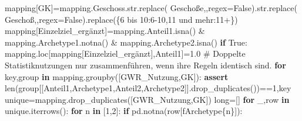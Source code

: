 \documentclass[
  ngerman,
  a4paper,
  DIV=11]{scrreprt}
\newenvironment{Shaded}{\begin{snugshade}}{\end{snugshade}}
\newcommand{\BuiltInTok}[1]{\textcolor[rgb]{0.00,0.23,0.31}{#1}}
\newcommand{\CommentTok}[1]{\textcolor[rgb]{0.37,0.37,0.37}{#1}}
\newcommand{\ControlFlowTok}[1]{\textcolor[rgb]{0.00,0.23,0.31}{\textbf{#1}}}
\newcommand{\DecValTok}[1]{\textcolor[rgb]{0.68,0.00,0.00}{#1}}
\newcommand{\FloatTok}[1]{\textcolor[rgb]{0.68,0.00,0.00}{#1}}
\newcommand{\KeywordTok}[1]{\textcolor[rgb]{0.00,0.23,0.31}{\textbf{#1}}}
\newcommand{\NormalTok}[1]{\textcolor[rgb]{0.00,0.23,0.31}{#1}}
\newcommand{\OperatorTok}[1]{\textcolor[rgb]{0.37,0.37,0.37}{#1}}
\newcommand{\SpecialCharTok}[1]{\textcolor[rgb]{0.37,0.37,0.37}{#1}}
\newcommand{\SpecialStringTok}[1]{\textcolor[rgb]{0.13,0.47,0.30}{#1}}
\newcommand{\StringTok}[1]{\textcolor[rgb]{0.13,0.47,0.30}{#1}}
\newcommand{\VariableTok}[1]{\textcolor[rgb]{0.07,0.07,0.07}{#1}}
\begin{document}
\begin{Shaded}
\begin{Highlighting}[]
\NormalTok{mapping[}\StringTok{\textquotesingle{}GK\textquotesingle{}}\NormalTok{]}\OperatorTok{=}\NormalTok{mapping.Geschoss.}\BuiltInTok{str}\NormalTok{.replace(}\StringTok{\textquotesingle{} Geschoße\textquotesingle{}}\NormalTok{,}\StringTok{\textquotesingle{}\textquotesingle{}}\NormalTok{,regex}\OperatorTok{=}\VariableTok{False}\NormalTok{).}\BuiltInTok{str}\NormalTok{.replace(}\StringTok{\textquotesingle{} Geschoß\textquotesingle{}}\NormalTok{,}\StringTok{\textquotesingle{}\textquotesingle{}}\NormalTok{,regex}\OperatorTok{=}\VariableTok{False}\NormalTok{).replace(\{}\StringTok{\textquotesingle{}6 bis 10\textquotesingle{}}\NormalTok{:}\StringTok{\textquotesingle{}6{-}10\textquotesingle{}}\NormalTok{,}\StringTok{\textquotesingle{}11 und mehr\textquotesingle{}}\NormalTok{:}\StringTok{\textquotesingle{}11+\textquotesingle{}}\NormalTok{\})}
\NormalTok{mapping[}\StringTok{\textquotesingle{}Einzelziel\_ergänzt\textquotesingle{}}\NormalTok{]}\OperatorTok{=}\NormalTok{mapping.Anteil1.isna() }\OperatorTok{\&}\NormalTok{ mapping.Archetype1.notna() }\OperatorTok{\&}\NormalTok{ mapping.Archetype2.isna()}
\ControlFlowTok{if} \VariableTok{True}\NormalTok{:}
\NormalTok{    mapping.loc[mapping[}\StringTok{\textquotesingle{}Einzelziel\_ergänzt\textquotesingle{}}\NormalTok{],}\StringTok{\textquotesingle{}Anteil1\textquotesingle{}}\NormalTok{]}\OperatorTok{=}\FloatTok{1.0}
\CommentTok{\# Doppelte Statistiknutzungen nur zusammenführen, wenn ihre Regeln identisch sind.}
\ControlFlowTok{for}\NormalTok{ key,group }\KeywordTok{in}\NormalTok{ mapping.groupby([}\StringTok{\textquotesingle{}GWR\_Nutzung\textquotesingle{}}\NormalTok{,}\StringTok{\textquotesingle{}GK\textquotesingle{}}\NormalTok{]):}
    \ControlFlowTok{assert} \BuiltInTok{len}\NormalTok{(group[[}\StringTok{\textquotesingle{}Anteil1\textquotesingle{}}\NormalTok{,}\StringTok{\textquotesingle{}Archetype1\textquotesingle{}}\NormalTok{,}\StringTok{\textquotesingle{}Anteil2\textquotesingle{}}\NormalTok{,}\StringTok{\textquotesingle{}Archetype2\textquotesingle{}}\NormalTok{]].drop\_duplicates())}\OperatorTok{==}\DecValTok{1}\NormalTok{,key}
\NormalTok{unique}\OperatorTok{=}\NormalTok{mapping.drop\_duplicates([}\StringTok{\textquotesingle{}GWR\_Nutzung\textquotesingle{}}\NormalTok{,}\StringTok{\textquotesingle{}GK\textquotesingle{}}\NormalTok{])}
\BuiltInTok{long}\OperatorTok{=}\NormalTok{[]}
\ControlFlowTok{for}\NormalTok{ \_,row }\KeywordTok{in}\NormalTok{ unique.iterrows():}
    \ControlFlowTok{for}\NormalTok{ n }\KeywordTok{in}\NormalTok{ [}\DecValTok{1}\NormalTok{,}\DecValTok{2}\NormalTok{]:}
        \ControlFlowTok{if}\NormalTok{ pd.notna(row[}\SpecialStringTok{f\textquotesingle{}Archetype}\SpecialCharTok{\{}\NormalTok{n}\SpecialCharTok{\}}\SpecialStringTok{\textquotesingle{}}\NormalTok{]):}

\end{Highlighting}
\end{Shaded}
\end{document}
